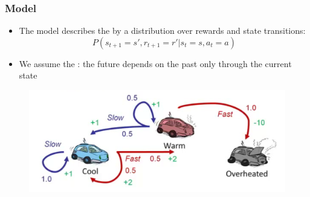 \documentclass[handout]{beamer}
\begin{document}
\begin{frame}\frametitle{Model}\small
\begin{itemize}
\item The model describes the  by a distribution over rewards and state transitions:
\[
P(s_{t+1}=s', r_{t+1}=r' | s_t = s, a_t = a)
\]
\item We assume the : the future depends on the past only through the current state
\end{itemize}
\begin{figure}
\includegraphics[width=0.7\linewidth]{Figures/rll6} 
\end{figure}
\end{frame}
\end{document}
